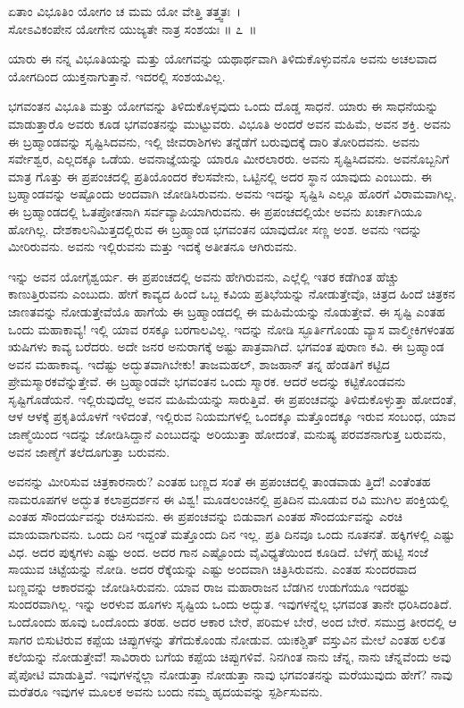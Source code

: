 \begin{shloka}
ಏತಾಂ ವಿಭೂತಿಂ ಯೋಗಂ ಚ ಮಮ ಯೋ ವೇತ್ತಿ ತತ್ತ್ವತಃ~।\\ಸೋಽವಿಕಂಪೇನ ಯೋಗೇನ ಯುಜ್ಯತೇ ನಾತ್ರ ಸಂಶಯಃ \hfill॥ ೭~॥
\end{shloka}

\begin{artha}
ಯಾರು ಈ ನನ್ನ ವಿಭೂತಿಯನ್ನು ಮತ್ತು ಯೋಗವನ್ನು ಯಥಾರ್ಥವಾಗಿ ತಿಳಿದುಕೊಳ್ಳುವನೊ ಅವನು ಅಚಲವಾದ ಯೋಗದಿಂದ ಯುಕ್ತನಾಗುತ್ತಾನೆ. ಇದರಲ್ಲಿ ಸಂಶಯವಿಲ್ಲ. 
\end{artha}

ಭಗವಂತನ ವಿಭೂತಿ ಮತ್ತು ಯೋಗವನ್ನು ತಿಳಿದುಕೊಳ್ಳವುದು ಒಂದು ದೊಡ್ಡ ಸಾಧನೆ. ಯಾರು ಈ ಸಾಧನೆಯನ್ನು ಮಾಡುತ್ತಾರೊ ಅವರು ಕೂಡ ಭಗವಂತನನ್ನು ಮುಟ್ಟುವರು. ವಿಭೂತಿ ಅಂದರೆ ಅವನ ಮಹಿಮೆ, ಅವನ ಶಕ್ತಿ. ಅವನು ಈ ಬ್ರಹ್ಮಾಂಡವನ್ನು ಸೃಷ್ಟಿಸಿದವನು, ಇಲ್ಲಿ ಜೀವರಾಶಿಗಳು ತನ್ನೆಡೆಗೆ ಬರುವುದಕ್ಕೆ ದಾರಿ ತೋರಿದವನು. ಅವನು ಸರ್ವೇಶ್ವರ, ಎಲ್ಲದಕ್ಕೂ ಒಡೆಯ. ಅವನಾಜ್ಞೆಯನ್ನು ಯಾರೂ ಮೀರಲಾರರು. ಅವನು ಸೃಷ್ಟಿಸಿದವನು. ಅವನೊಬ್ಬನಿಗೆ ಮಾತ್ರ ಗೊತ್ತು ಈ ಪ್ರಪಂಚದಲ್ಲಿ ಪ್ರತಿಯೊಂದರ ಕೆಲಸವೇನು, ಒಟ್ಟಿನಲ್ಲಿ ಅದರ ಸ್ಥಾನ ಯಾವುದು ಎಂಬುದು. ಈ ಬ್ರಹ್ಮಾಂಡವನ್ನು ಅಷ್ಟೊಂದು ಅಂದವಾಗಿ ಜೋಡಿಸಿರುವನು. ಅವನು ಇದನ್ನು ಸೃಷ್ಟಿಸಿ ಎಲ್ಲೂ ಹೊರಗೆ ವಿರಾಮವಾಗಿಲ್ಲ. ಈ ಬ್ರಹ್ಮಾಂಡದಲ್ಲಿ ಓತಪ್ರೋತನಾಗಿ ಸರ್ವವ್ಯಾಪಿಯಾಗಿರುವನು. ಈ ಪ್ರಪಂಚದಲ್ಲಿಯೇ ಅವನು ಖರ್ಚಾಗಿಯೂ ಹೋಗಿಲ್ಲ. ದೇಶಕಾಲನಿಮಿತ್ತದಲ್ಲಿರುವ ಈ ಬ್ರಹ್ಮಾಂಡ ಭಗವಂತನ ಯಾವುದೋ ಸಣ್ಣ ಅಂಶ. ಅವನು ಇದನ್ನು ಮೀರಿರುವನು. ಅವನು ಇಲ್ಲಿರುವನು ಮತ್ತು ಇದಕ್ಕೆ ಅತೀತನೂ ಆಗಿರುವನು.

ಇನ್ನು ಅವನ ಯೋಗೈಶ್ವರ್ಯ. ಈ ಪ್ರಪಂಚದಲ್ಲಿ ಅವನು ಹೇಗಿರುವನು, ಎಲ್ಲೆಲ್ಲಿ ಇತರ ಕಡೆಗಿಂತ ಹೆಚ್ಚು ಕಾಣುತ್ತಿರುವನು ಎಂಬುದು. ಹೇಗೆ ಕಾವ್ಯದ ಹಿಂದೆ ಒಬ್ಬ ಕವಿಯ ಪ್ರತಿಭೆಯನ್ನು ನೋಡುತ್ತೇವೊ, ಚಿತ್ರದ ಹಿಂದೆ ಚಿತ್ರಕನ ಜಾಣತವನ್ನು ನೋಡುತ್ತೇವೆಯೊ ಹಾಗೆಯೆ ಈ ಬ್ರಹ್ಮಾಂಡದಲ್ಲಿ ಈ ಮಹಿಮೆಯನ್ನು ನೊಡುತ್ತೇವೆ. ಈ ಸೃಷ್ಟಿ ಎಂತಹ ಒಂದು ಮಹಾಕಾವ್ಯ! ಇಲ್ಲಿ ಯಾವ ರಸಕ್ಕೂ ಬರಗಾಲವಿಲ್ಲ. ಇದನ್ನು ನೋಡಿ ಸ್ಫೂರ್ತಿಗೊಂಡು ವ್ಯಾಸ ವಾಲ್ಮೀಕಿಗಳಂತಹ ಋಷಿಗಳು ಕಾವ್ಯ ಬರೆದರು. ಅದೇ ಜನರ ಅನುರಾಗಕ್ಕೆ ಅಷ್ಟು ಪಾತ್ರವಾಗಿದೆ. ಭಗವಂತ ಪುರಾಣ ಕವಿ. ಈ ಬ್ರಹ್ಮಾಂಡ ಅವನ ಮಹಾಕಾವ್ಯ. ಇದೆಷ್ಟು ಅದ್ಭುತವಾಗಿಬೇಕು! ತಾಜಮಹಲ್, ಶಾಜಹಾನ್ ತನ್ನ ಹೆಂಡತಿಗೆ ಕಟ್ಟಿದ ಪ್ರೇಮಸ್ಮಾರಕವೆನ್ನುತ್ತೇವೆ. ಈ ಬ್ರಹ್ಮಾಂಡವೇ ಭಗವಂತನ ಒಂದು ಸ್ಮಾರಕ. ಆದರೆ ಅದನ್ನು ಕಟ್ಟಿಕೊಂಡವನು ಸೃಷ್ಟಿಗೊಡೆಯನೆ. ಇಲ್ಲಿರುವುದೆಲ್ಲ ಅವನ ಮಹಿಮೆಯನ್ನು ಸಾರುತ್ತಿವೆ. ಈ ಪ್ರಪಂಚವನ್ನು ತಿಳಿದುಕೊಳ್ಳುತ್ತಾ ಹೋದಂತೆ, ಆಳ ಆಳಕ್ಕೆ ಪ್ರಕೃತಿಯೊಳಗೆ ಇಳಿದಂತೆ, ಇಲ್ಲಿರುವ ನಿಯಮಗಳಲ್ಲಿ ಒಂದಕ್ಕೂ ಮತ್ತೊಂದಕ್ಕೂ ಇರುವ ಸಂಬಂಧ, ಯಾವ ಜಾಣ್ಮೆಯಿಂದ ಇದನ್ನು ಜೋಡಿಸಿದ್ದಾನೆ ಎಂಬುದನ್ನು ಅರಿಯುತ್ತಾ ಹೋದಂತೆ, ಮನುಷ್ಯ ಪರವಶನಾಗುತ್ತ ಬರುವನು, ಅವನ ಜಾಣ್ಮೆಗೆ ತಲೆದೂಗುತ್ತಾ ಬರುವನು.

ಅವನನ್ನು ಮೀರಿಸುವ ಚಿತ್ರಕಾರನಾರು? ಎಂತಹ ಬಣ್ಣದ ಸಂತೆ ಈ ಪ್ರಪಂಚದಲ್ಲಿ ತಾಂಡವಾಡು ತ್ತಿದೆ! ಎಂತೆಂತಹ ನಾಮರೂಪಗಳ ಅದ್ಭುತ ಕಲಾಪ್ರದರ್ಶನ ಈ ವಿಶ್ವ! ಮೂಡಲಂಚಿನಲ್ಲಿ ಪ್ರತಿದಿನ ಮೂಡುವ ರವಿ ಮುಗಿಲ ಪಂಕ್ತಿಯಲ್ಲಿ ಎಂತಹ ಸೌಂದರ್ಯವನ್ನು ರಚಿಸುವನು. ಈ ಪ್ರಪಂಚವನ್ನು ಬಿಡುವಾಗ ಎಂತಹ ಸೌಂದರ್ಯವನ್ನು ಎರಚಿ ಮಾಯವಾಗುವನು. ಒಂದು ದಿನ ಇದ್ದಂತೆ ಮತ್ತೊಂದು ದಿನ ಇಲ್ಲ. ಪ್ರತಿ ದಿನವೂ ಒಂದು ನೂತನತೆ. ಹಕ್ಕಿಗಳಲ್ಲಿ ಎಷ್ಟು ವಿಧ. ಅದರ ಪುಕ್ಕಗಳು ಎಷ್ಟು ಅಂದ. ಅದರ ಗಾನ ಎಷ್ಟೊಂದು ವೈವಿಧ್ಯತೆಯಿಂದ ಕೂಡಿದೆ. ಬೆಳಗ್ಗೆ ಹುಟ್ಟಿ ಸಂಜೆ ಸಾಯುವ ಚಿಟ್ಟೆಯನ್ನು ನೋಡಿ. ಅದರ ರೆಕ್ಕೆಯನ್ನು ಎಷ್ಟು ಅಂದವಾಗಿ ಚಿತ್ರಿಸಿರುವನು. ಎಂತಹ ಸುಂದರವಾದ ಬಣ್ಣವನ್ನು ಆಕಾರವನ್ನು ಜೋಡಿಸಿರುವನು. ಯಾವ ರಾಜ ಮಹಾರಾಜನ ಬೆಡಗಿನ ಉಡುಗೆಯೂ ಇದರಷ್ಟು ಸುಂದರವಾಗಿಲ್ಲ. ಇನ್ನು ಅರಳುವ ಹೂಗಳು ಸೃಷ್ಟಿಯ ಒಂದು ಅದ್ಭುತ. ಇವುಗಳನ್ನೆಲ್ಲ ಭಗವಂತ ತಾನೇ ಧರಿಸಿದಂತಿದೆ. ಒಂದೊಂದು ಹೂವು ಒಂದೊಂದು ತರಹ. ಅದರ ಆಕಾರ ಬೇರೆ, ಪರಿಮಳ ಬೇರೆ, ಅಂದ ಬೇರೆ. ಸಮುದ್ರ ತೀರದಲ್ಲಿ ಆ ಸಾಗರ ಬಿಸುಟಿರುವ ಕಪ್ಪೆಯ ಚಿಪ್ಪುಗಳನ್ನು ತೆಗೆದುಕೊಂಡು ನೋಡುವ. ಯಃಕಶ್ಚಿತ್ ವಸ್ತುವಿನ ಮೇಲೆ ಎಂತಹ ಲಲಿತ ಕಲೆಯನ್ನು ನೋಡುತ್ತೇವೆ! ಸಾವಿರಾರು ಬಗೆಯ ಕಪ್ಪೆಯ ಚಿಪ್ಪುಗಳಿವೆ. ನಿನಗಿಂತ ನಾನು ಚೆನ್ನ, ನಾನು ಚೆನ್ನವೆಂದು ಅವು ಪೈಪೋಟಿ ಮಾಡುತ್ತಿವೆ. ಇವುಗಳನ್ನೆಲ್ಲಾ ನೋಡುತ್ತಾ ನೋಡುತ್ತಾ ನಾವು ಭಗವಂತನನ್ನು ಮರೆಯುವುದು ಹೇಗೆ? ನಾವು ಮರೆತರೂ ಇವುಗಳ ಮೂಲಕ ಅವನು ಬಂದು ನಮ್ಮ ಹೃದಯವನ್ನು ಸ್ಪರ್ಶಿಸುವನು.

